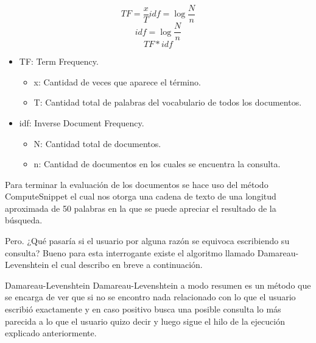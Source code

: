 \documentclass{beamer}
\begin{document}
\begin{frame}
  \begin{equation}\label{eq:grav}
    TF = \frac{x}{T}       idf  = \log {\frac{N}{n}}
\end{equation}
\begin{equation}
    idf  = \log {\frac{N}{n}}
\end{equation}
\begin{equation}
    TF\ast idf
\end{equation}
\end{frame}

\begin{frame}
  \begin{itemize}
    \item TF\@: Term Frequency.
    \begin{itemize}
        \item x\@: Cantidad de veces que aparece el término.
        \item T\@: Cantidad total de palabras del vocabulario de todos los documentos.
    \end{itemize}
    \item idf: Inverse Document Frequency.
    \begin{itemize}
        \item N\@: Cantidad total de documentos.
        \item n\@: Cantidad de documentos en los cuales se encuentra la consulta.
    \end{itemize}
\end{itemize}
\end{frame}

\begin{frame}
  Para terminar la evaluación de los documentos se hace uso del método ComputeSnippet el cual nos otorga 
    una cadena de texto de una longitud aproximada de 50 palabras en la que se puede apreciar
    el resultado de la búsqueda.
    
    Pero. ¿Qué pasaría si el usuario por alguna razón se equivoca escribiendo su consulta?
    Bueno para esta interrogante existe el algoritmo llamado Damareau-Levenshtein el cual describo en breve a continuación.
\end{frame}

\begin{frame}{Damareau-Levenshtein}
  Damareau-Levenshtein a modo resumen es un método que se encarga de ver que si no se encontro nada
  relacionado con lo que el usuario escribió exactamente y en caso positivo busca una posible consulta
  lo más parecida a lo que el usuario quizo decir y luego sigue el hilo de la ejecución explicado anteriormente.
\end{frame}
\end{document}

